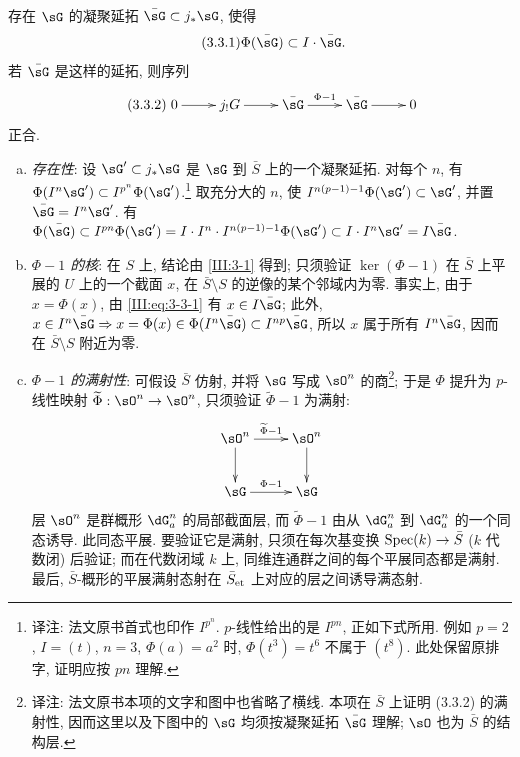 \begin{lemma_}\label{III:3-3}
存在 $\sG$ 的凝聚延拓 $\bar\sG\subset j_*\sG$, 使得
\begin{equation*}\tag{3.3.1}\label{III:eq:3-3-1}
  \Phi(\bar\sG)\subset I\cdot \bar\sG\text{.}
\end{equation*}
若 $\bar\sG$ 是这样的延拓, 则序列
\begin{equation*}\tag{3.3.2}\label{III:eq:3-3-2}
\xymatrix{
  0 \ar[r]
    & j_! G \ar[r]
    & \bar\sG \ar[r]^-{\Phi-1}
    & \bar\sG \ar[r]
    & 0
}
\end{equation*}
正合.
\end{lemma_}
\begin{enumerate}[a)]
  \item \emph{存在性}: 设 $\sG'\subset j_*\sG$ 是 $\sG$ 到 $\bar S$ 上的一个凝聚延拓. 对每个 $n$, 有 $\Phi(I^n \sG')\subset I^{p^n}\Phi(\sG')$.\footnote{译注: 法文原书首式也印作 $I^{p^n}$. $p$-线性给出的是 $I^{pn}$, 正如下式所用. 例如 $p=2$, $I=(t)$, $n=3$, $\Phi(a)=a^2$ 时, $\Phi(t^3)=t^6$ 不属于 $(t^8)$. 此处保留原排字, 证明应按 $pn$ 理解.} 取充分大的 $n$, 使 $I^{n(p-1)-1}\Phi(\sG')\subset \sG'$, 并置 $\bar\sG=I^n\sG'$. 有 $\Phi(\bar\sG)\subset I^{p n}\Phi(\sG')
    =I\cdot I^n\cdot I^{n(p-1)-1}\Phi(\sG')\subset I\cdot I^n\sG'
    = I\bar\sG$.
  \item \emph{$\Phi-1$ 的核}: 在 $S$ 上, 结论由 \ref{III:3-1} 得到; 只须验证 $\ker(\Phi-1)$ 在 $\bar S$ 上平展的 $U$ 上的一个截面 $x$, 在 $\bar S\setminus S$ 的逆像的某个邻域内为零. 事实上, 由于 $x=\Phi(x)$, 由 \eqref{III:eq:3-3-1} 有 $x\in I\bar\sG$; 此外, $x\in I^n\bar\sG\Rightarrow x=\Phi(x)\in\Phi(I^n\bar\sG)\subset I^{n p}\bar\sG$, 所以 $x$ 属于所有 $I^n\bar\sG$, 因而在 $\bar S\setminus S$ 附近为零.
  \item \emph{$\Phi-1$ 的满射性}: 可假设 $\bar S$ 仿射, 并将 $\sG$ 写成 $\sO^n$ 的商\footnote{译注: 法文原书本项的文字和图中也省略了横线. 本项在 $\bar S$ 上证明 (3.3.2) 的满射性, 因而这里以及下图中的 $\sG$ 均须按凝聚延拓 $\bar\sG$ 理解; $\sO$ 也为 $\bar S$ 的结构层.}; 于是 $\Phi$ 提升为 $p$-线性映射 $\widetilde\Phi:\sO^n\to\sO^n$, 只须验证 $\widetilde\Phi-1$ 为满射:
    \[\xymatrix{
      \sO^n \ar[r]^-{\widetilde \Phi-1} \ar[d]
        & \sO^n \ar[d] \\
      \sG \ar[r]^-{\Phi-1}
        & \sG
    }\]
    层 $\sO^n$ 是群概形 $\dG_a^n$ 的局部截面层, 而 $\widetilde\Phi-1$ 由从 $\dG_a^n$ 到 $\dG_a^n$ 的一个同态诱导. 此同态平展. 要验证它是满射, 只须在每次基变换 $\operatorname{Spec}(k)\to\bar S$ ($k$ 代数闭) 后验证; 而在代数闭域 $k$ 上, 同维连通群之间的每个平展同态都是满射. 最后, $\bar S$-概形的平展满射态射在 ${\bar S}_{\textnormal{et}}$ 上对应的层之间诱导满态射.
\end{enumerate}

